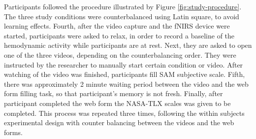 \documentclass[../main/Feedback.tex]{subfiles}
\begin{document}
Participants followed the procedure illustrated by Figure \ref{fig:study-procedure}. 
The three study conditions were counterbalanced using Latin square, to avoid learning effects.
Fourth, after the video capture and the fNIRS device were started, participants were asked to relax, in order to record a baseline of the hemodynamic activity while participants are at rest. Next, they are asked to open one of the three videos, depending on the counterbalancing order. 
They were instructed by the researcher to manually start certain condition or video. 
After watching of the video was finished, participants fill SAM subjective scale. 
Fifth, there was approximately 2 minute waiting period between the video and the web form filling task, so that participant's memory is not fresh. Finally, after participant completed the web form the NASA-TLX scales was given to be completed. 
This process was repeated three times, following the within subjects experimental design with counter balancing between the videos and the web forms.
\end{document}
